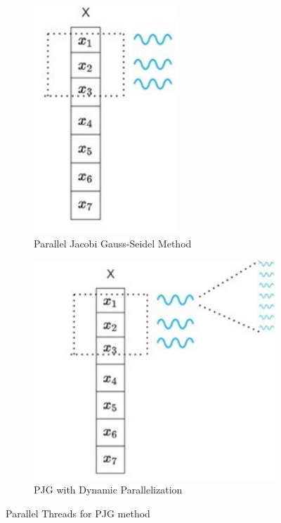 \documentclass[11pt]{article}       %
\begin{document}
\begin{figure}[h]
\centering
\begin{subfigure}{.5\textwidth}
 \centering
 \includegraphics[width=0.6\textwidth]{Figures/pjg}
 \caption{Parallel Jacobi Gauss-Seidel Method}
 \label{fig:pjg}
\end{subfigure}%
\begin{subfigure}{.5\textwidth}
 \centering
 \includegraphics[width=1\textwidth]{Figures/pjg_dp}
 \caption{PJG with Dynamic Parallelization}
 \label{fig:pig_dp}
\end{subfigure}
\caption{Parallel Threads for PJG method}
\end{figure}
\end{document}
